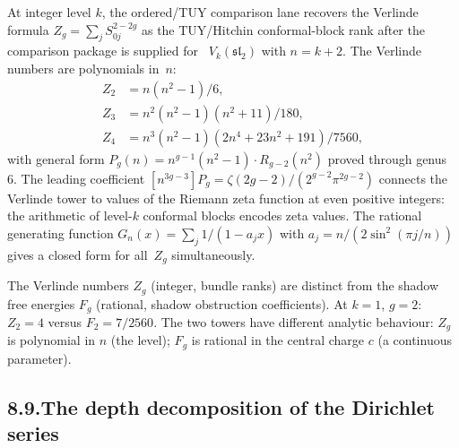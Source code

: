 \documentclass[11pt,reqno]{amsart}
\theoremstyle{definition}
\theoremstyle{remark}
\numberwithin{equation}{section}
\begin{document}
At integer level $k$, the ordered/TUY comparison lane recovers the
Verlinde formula
$Z_g = \sum_j S_{0j}^{2-2g}$ as the TUY/Hitchin conformal-block rank
after the comparison package is supplied for
~$V_k(\mathfrak{sl}_2)$ with $n = k+2$.
The Verlinde numbers are polynomials in~$n$:
\begin{align*}
Z_2 &= n(n^2-1)/6, \\
Z_3 &= n^2(n^2-1)(n^2+11)/180, \\
Z_4 &= n^3(n^2-1)(2n^4+23n^2+191)/7560,
\end{align*}
with general form $P_g(n) = n^{g-1}(n^2{-}1) \cdot
R_{g-2}(n^2)$ proved through genus~$6$. The leading
coefficient $[n^{3g-3}]P_g = \zeta(2g{-}2)/
(2^{g-2}\pi^{2g-2})$ connects the Verlinde tower to values
of the Riemann zeta function at even positive integers:
the arithmetic of level-$k$ conformal blocks encodes zeta
values. The rational generating function
$G_n(x) = \sum_j 1/(1 - a_j x)$ with
$a_j = n/(2\sin^2(\pi j/n))$ gives a closed form for
all~$Z_g$ simultaneously.

The Verlinde numbers $Z_g$ (integer, bundle ranks) are
distinct from the shadow free energies $F_g$ (rational, shadow
obstruction coefficients). At $k = 1$, $g = 2$:
$Z_2 = 4$ versus $F_2 = 7/2560$. The two towers have
different analytic behaviour: $Z_g$ is polynomial in $n$
(the level); $F_g$ is rational in the central charge $c$
(a continuous parameter).

\subsection*{8.9.\enspace The depth decomposition of the Dirichlet series}
\end{document}
